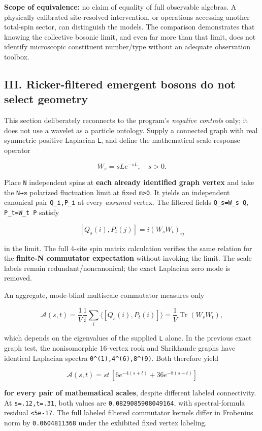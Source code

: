 \documentclass[
  10pt,
  a4paper,
]{article}
\begin{document}
\textbf{Scope of equivalence:} no claim of equality of full observable algebras. A physically calibrated site-resolved intervention, or operations accessing another total-spin sector, can distinguish the models. The comparison demonstrates that knowing the collective bosonic limit, and even far more than that limit, does not identify microscopic constituent number/type without an adequate observation toolbox.

\subsection{III. Ricker-filtered emergent bosons do not select geometry}\label{iii.-ricker-filtered-emergent-bosons-do-not-select-geometry}

This section deliberately reconnects to the program's \emph{negative controls} only; it does not use a wavelet as a particle ontology. Supply a connected graph with real symmetric positive Laplacian \texttt{L}, and define the mathematical scale-response operator

\[
W_s=s L e^{-sL},\quad s>0.
\]

Place \texttt{N} independent spins at \textbf{each already identified graph vertex} and take the \texttt{N→∞} polarized fluctuation limit at fixed \texttt{m\textgreater{}0}. It yields an independent canonical pair \texttt{Q\_i,P\_i} at every \emph{assumed} vertex. The filtered fields \texttt{Q\_s=W\_s\ Q}, \texttt{P\_t=W\_t\ P} satisfy

\[
[Q_s(i),P_t(j)] = i(W_sW_t)_{ij}
\]

in the limit. The full 4-site spin matrix calculation verifies the same relation for the \textbf{finite-N commutator expectation} without invoking the limit. The scale labels remain redundant/noncanonical; the exact Laplacian zero mode is removed.

An aggregate, mode-blind multiscale commutator measures only

\[
\mathcal A(s,t)=\frac1{V}\frac1i\sum_i\langle [Q_s(i),P_t(i)]\rangle
=\frac1V\operatorname{Tr}(W_sW_t),
\]

which depends on the eigenvalues of the supplied \texttt{L} alone. In the previous exact graph test, the nonisomorphic 16-vertex rook and Shrikhande graphs have identical Laplacian spectra \texttt{0\^{}(1),4\^{}(6),8\^{}(9)}. Both therefore yield

\[
\boxed{\mathcal A(s,t)=st\,[6e^{-4(s+t)}+36e^{-8(s+t)}]}
\]

\textbf{for every pair of mathematical scales}, despite different labeled connectivity. At \texttt{s=.12,t=.31}, both values are \texttt{0.0829085908049164}, with spectral-formula residual \texttt{\textless{}5e-17}. The full labeled filtered commutator kernels differ in Frobenius norm by \texttt{0.0604811368} under the exhibited fixed vertex labeling.
\end{document}

